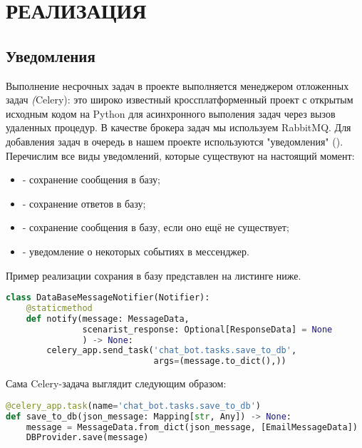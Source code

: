 \section{РЕАЛИЗАЦИЯ}
    \subsection{Уведомления}
    Выполнение несрочных задач в проекте выполняется менеджером отложенных задач \textit(Celery):
    это широко известный кроссплатформенный проект с открытым исходным кодом на Python для
    асинхронного выполения задач через вызов удаленных процедур. В качестве брокера задач мы используем RabbitMQ.
    Для добавления задач в очередь в нашем проекте используются "уведомления" ().
    Перечислим все виды уведомлений, которые существуют на настоящий момент:
    \begin{itemize}
        \item {} - сохранение сообщения в базу;
        \item {} - сохранение ответов в базу;
        \item {} - сохранение сообщения в базу, если оно ещё не существует;
        \item {} - уведомление о некоторых событиях в мессенджер.
    \end{itemize}
    Пример реализации сохрания в базу представлен на листинге ниже.
\begin{lstlisting}[language=Python]
class DataBaseMessageNotifier(Notifier):
    @staticmethod
    def notify(message: MessageData,
               scenarist_response: Optional[ResponseData] = None
               ) -> None:
        celery_app.send_task('chat_bot.tasks.save_to_db',
                             args=(message.to_dict(),))
\end{lstlisting}

    Сама Celery-задача выглядит следующим образом:
\begin{lstlisting}[language=Python]
@celery_app.task(name='chat_bot.tasks.save_to_db')
def save_to_db(json_message: Mapping[str, Any]) -> None:
    message = MessageData.from_dict(json_message, [EmailMessageData])
    DBProvider.save(message)
\end{lstlisting}

